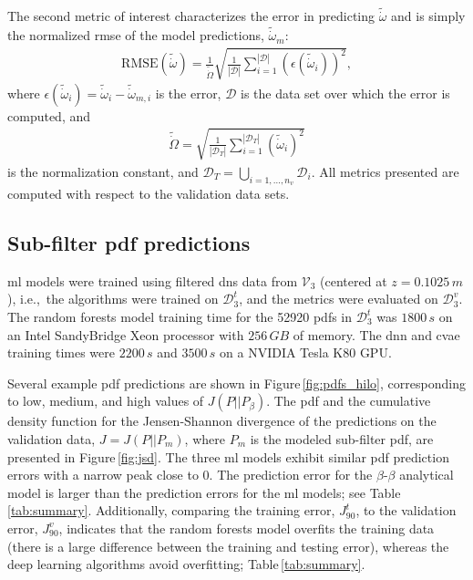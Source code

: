 \documentclass[review]{elsarticle}
\newcommand{\wt}[1]{\widetilde{#1}}
\begin{document}
The second metric of interest characterizes the error in predicting
$\wt{\dot{\omega}}$ and is simply the normalized \gls{rmse} of the model predictions, $\wt{\dot{\omega}}_m$:
\begin{align}
  \label{eq:rmse}
  \text{RMSE}(\wt{\dot{\omega}}) = \frac{1}{\wt{\dot{\Omega}}}\sqrt{ \frac{1}{|\mathcal{D}|}\sum_{i=1}^{|\mathcal{D}|}\left( \epsilon(\wt{\dot{\omega}}_i) \right)^2},
\end{align}
where
$\epsilon(\wt{\dot{\omega}}_i) = \wt{\dot{\omega}}_i -
\wt{\dot{\omega}}_{m,i}$ is the error, $\mathcal{D}$ is the data set
over which the error is computed, and
\begin{align}
  \label{eq:norm}
  \wt{\dot{\Omega}} = \sqrt{\frac{1}{|\mathcal{D}_T|} \sum_{i=1}^{|\mathcal{D}_T|} \left( \wt{\dot{\omega}}_i \right)^2}
\end{align}
is the normalization constant, and
$\mathcal{D}_T = \bigcup\limits_{i=1, \dots, n_v} \mathcal{D}_i$. All metrics
presented are computed with respect to the validation data sets.

\subsection{Sub-filter \acrlong{pdf} predictions}\label{sec:predictions}

\Gls{ml} models were trained using filtered \gls{dns} data
from $\mathcal{V}_3$ (centered at $z=0.1025\,\unit{m}$), i.e.,\ the
algorithms were trained on $\mathcal{D}_3^t$, and the metrics were evaluated
on $\mathcal{D}_3^v$. The random forests model training time for the
52920 \glspl{pdf} in $\mathcal{D}_3^t$ was $1800\,\unit{s}$ on an Intel
SandyBridge Xeon processor with $256\,\unit{GB}$ of memory. The
\gls{dnn} and \gls{cvae} training times were $2200\,\unit{s}$ and
$3500\,\unit{s}$ on a NVIDIA Tesla K80 GPU.

Several example \gls{pdf} predictions are shown in
Figure\,\ref{fig:pdfs_hilo}, corresponding to low, medium, and high
values of $J(P||P_{\beta})$. The \gls{pdf} and the cumulative density
function for the Jensen-Shannon divergence of the predictions on the
validation data, $J=J(P||P_m)$, where $P_m$ is the modeled sub-filter
\gls{pdf}, are presented in Figure\,\ref{fig:jsd}. The three \gls{ml}
models exhibit similar \gls{pdf} prediction errors with a narrow peak
close to 0. The prediction error for the $\beta$-$\beta$ analytical
model is larger than the prediction errors for the \gls{ml} models; see
Table\,\ref{tab:summary}. Additionally, comparing the training error,
$J^t_{90}$, to the validation error, $J^v_{90}$, indicates that the
random forests model overfits the training data (there is a large difference
between the training and testing error), whereas the deep learning
algorithms avoid overfitting; Table\,\ref{tab:summary}.
\end{document}
